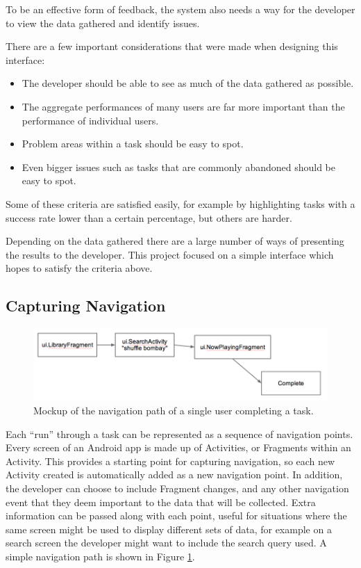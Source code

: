 To be an effective form of feedback, the system also needs a way for the developer to view the data gathered and identify issues.

There are a few important considerations that were made when designing this interface:

\begin{itemize}
  \item The developer should be able to see as much of the data gathered as possible.
  \item The aggregate performances of many users are far more important than the performance of individual users.
  \item Problem areas within a task should be easy to spot.
  \item Even bigger issues such as tasks that are commonly abandoned should be easy to spot.
\end{itemize}

Some of these criteria are satisfied easily, for example by highlighting tasks with a success rate lower than a certain percentage, but others are harder.

Depending on the data gathered there are a large number of ways of presenting the results to the developer. This project focused on a simple interface which hopes to satisfy the criteria above.

\subsection{Capturing Navigation}

\begin{figure}[h]
 \centering
 \includegraphics[width=\textwidth]{images/single-path}
 \caption{Mockup of the navigation path of a single user completing a task.}
 \label{fig:task-navigation}
\end{figure}

Each ``run'' through a task can be represented as a sequence of navigation points. Every screen of
an Android app is made up of Activities, or Fragments within an Activity. This provides a starting
point for capturing navigation, so each new Activity created is automatically added as a new navigation point. In addition, 
the developer can choose to include Fragment changes, and any other navigation event that they deem important to 
the data that will be collected. Extra information can be passed along with each point, useful for situations
where the same screen might be used to display different sets of data, for example on a search screen the
developer might want to include the search query used. A simple navigation path is shown in Figure \ref{fig:task-navigation}.

